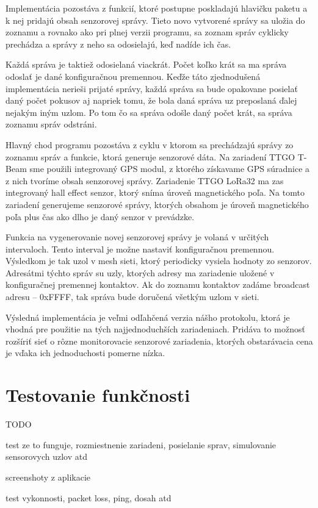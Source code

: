 \documentclass[slovak,master]{diploma}
\begin{document}
Implementácia pozostáva z funkcií, ktoré postupne poskladajú hlavičku paketu a k nej pridajú obsah senzorovej správy. Tieto novo vytvorené správy sa uložia do zoznamu 
a rovnako ako pri plnej verzii programu, sa zoznam správ cyklicky prechádza a správy z neho sa odosielajú, keď nadíde ich čas.

Každá správa je taktiež odosielaná viackrát. Počet koľko krát sa ma správa odoslať je dané konfiguračnou premennou. Keďže táto zjednodušená implementácia nerieši prijaté správy, 
každá správa sa bude opakovane posielať daný počet pokusov aj napriek tomu, že bola daná správa uz preposlaná ďalej nejakým iným uzlom. Po tom čo sa správa odošle 
daný počet krát, sa správa zoznamu správ odstráni.

Hlavný chod programu pozostáva z cyklu v ktorom sa prechádzajú správy zo zoznamu správ a funkcie, ktorá generuje senzorové dáta. Na zariadení TTGO T-Beam sme použili integrovaný 
GPS modul, z ktorého získavame GPS súradnice a z nich tvoríme obsah senzorovej správy. Zariadenie TTGO LoRa32 ma zas integrovaný hall effect senzor, ktorý sníma 
úroveň magnetického poľa. Na tomto zariadení generujeme senzorové správy, ktorých obsahom je úroveň magnetického poľa plus čas ako dlho je daný senzor v prevádzke.

Funkcia na vygenerovanie novej senzorovej správy je volaná v určitých intervaloch. Tento interval je možne nastaviť konfiguračnou premennou. Výsledkom je tak 
uzol v mesh sieti, ktorý periodicky vysiela hodnoty zo senzorov. Adresátmi týchto správ su uzly, ktorých adresy ma zariadenie uložené v konfiguračnej premennej kontaktov. 
Ak do zoznamu kontaktov zadáme broadcast adresu -- 0xFFFF, tak správa bude doručená všetkým uzlom v sieti.

Výsledná implementácia je veľmi odľahčená verzia nášho protokolu, ktorá je vhodná pre použitie na tých najjednoduchších zariadeniach. Pridáva to možnosť rozšíriť sieť 
o rôzne monitorovacie senzorové zariadenia, ktorých obstarávacia cena je vďaka ich jednoduchosti pomerne nízka.

\section{Testovanie funkčnosti}
TODO

test ze to funguje, rozmiestnenie zariadeni, posielanie sprav, simulovanie sensorovych uzlov atd

screenshoty z aplikacie

test vykonnosti, packet loss, ping, dosah atd
\end{document}
